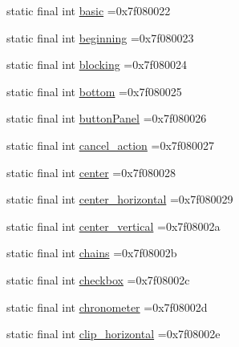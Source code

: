 \begin{DoxyCompactItemize}
\item 
static final int \mbox{\hyperlink{classbr_1_1unb_1_1cic_1_1mp_1_1marketmaster_1_1test_1_1R_1_1id_a1aaf925b6bfd2a092db3c87d7d2f83e6}{basic}} =0x7f080022
\item 
static final int \mbox{\hyperlink{classbr_1_1unb_1_1cic_1_1mp_1_1marketmaster_1_1test_1_1R_1_1id_a548c6532114ae404f93169bb710488c4}{beginning}} =0x7f080023
\item 
static final int \mbox{\hyperlink{classbr_1_1unb_1_1cic_1_1mp_1_1marketmaster_1_1test_1_1R_1_1id_a5e840636c43852e51be90cb6e91f06c8}{blocking}} =0x7f080024
\item 
static final int \mbox{\hyperlink{classbr_1_1unb_1_1cic_1_1mp_1_1marketmaster_1_1test_1_1R_1_1id_a245f9f3932ea6884d0dc04a167957650}{bottom}} =0x7f080025
\item 
static final int \mbox{\hyperlink{classbr_1_1unb_1_1cic_1_1mp_1_1marketmaster_1_1test_1_1R_1_1id_aaa401273c48b57e0050e69f659718a85}{button\+Panel}} =0x7f080026
\item 
static final int \mbox{\hyperlink{classbr_1_1unb_1_1cic_1_1mp_1_1marketmaster_1_1test_1_1R_1_1id_ab04e9f7f5f129f74f1414687f0c91e35}{cancel\+\_\+action}} =0x7f080027
\item 
static final int \mbox{\hyperlink{classbr_1_1unb_1_1cic_1_1mp_1_1marketmaster_1_1test_1_1R_1_1id_a480faee8c87e2fb80ce62ab10a4df3ab}{center}} =0x7f080028
\item 
static final int \mbox{\hyperlink{classbr_1_1unb_1_1cic_1_1mp_1_1marketmaster_1_1test_1_1R_1_1id_add05b37e5e580a5d010ca5a4fabc79a6}{center\+\_\+horizontal}} =0x7f080029
\item 
static final int \mbox{\hyperlink{classbr_1_1unb_1_1cic_1_1mp_1_1marketmaster_1_1test_1_1R_1_1id_a369ba7dead20ffd5283666bc0b46c817}{center\+\_\+vertical}} =0x7f08002a
\item 
static final int \mbox{\hyperlink{classbr_1_1unb_1_1cic_1_1mp_1_1marketmaster_1_1test_1_1R_1_1id_a5503de0adc0e6290d5bc2d7e950f486b}{chains}} =0x7f08002b
\item 
static final int \mbox{\hyperlink{classbr_1_1unb_1_1cic_1_1mp_1_1marketmaster_1_1test_1_1R_1_1id_af774f6a03dcc3590351740fa3781fd9d}{checkbox}} =0x7f08002c
\item 
static final int \mbox{\hyperlink{classbr_1_1unb_1_1cic_1_1mp_1_1marketmaster_1_1test_1_1R_1_1id_a330678b04a23e994fdc9cefa9705440b}{chronometer}} =0x7f08002d
\item 
static final int \mbox{\hyperlink{classbr_1_1unb_1_1cic_1_1mp_1_1marketmaster_1_1test_1_1R_1_1id_acc59a9d8f19022e056983f64b9d3abb8}{clip\+\_\+horizontal}} =0x7f08002e

\end{DoxyCompactItemize}
